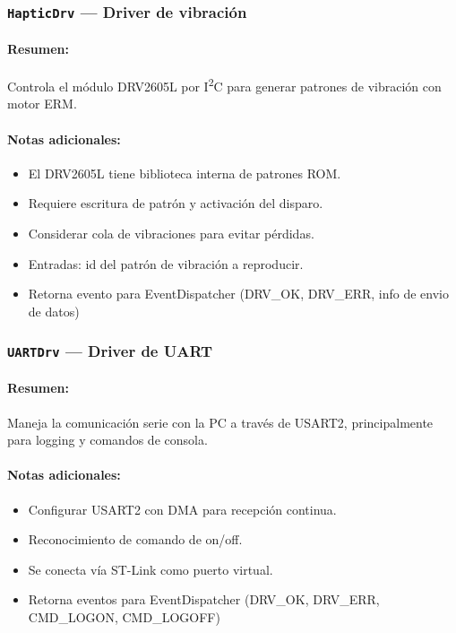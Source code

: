 \documentclass[11pt,a4paper]{article}
\begin{document}
\subsubsection{\texttt{HapticDrv} — Driver de vibración}
\paragraph{Resumen:} Controla el módulo DRV2605L por I\textsuperscript{2}C para generar patrones de vibración con motor ERM.
\paragraph{Notas adicionales:}
\begin{itemize}
  \item El DRV2605L tiene biblioteca interna de patrones ROM.
  \item Requiere escritura de patrón y activación del disparo.
  \item Considerar cola de vibraciones para evitar pérdidas.
  \item Entradas: id del patrón de vibración a reproducir.
  \item Retorna evento para EventDispatcher  (DRV\_OK, DRV\_ERR, info de envio de datos)
\end{itemize}

\subsubsection{\texttt{UARTDrv} — Driver de UART}
\paragraph{Resumen:} Maneja la comunicación serie con la PC a través de USART2, principalmente para logging y comandos de consola.
\paragraph{Notas adicionales:}
\begin{itemize}
  \item Configurar USART2 con DMA para recepción continua.
  \item Reconocimiento de comando de on/off.
  \item Se conecta vía ST-Link como puerto virtual.
  \item Retorna eventos para EventDispatcher  (DRV\_OK, DRV\_ERR, CMD\_LOGON, CMD\_LOGOFF)
\end{itemize}
\end{document}
